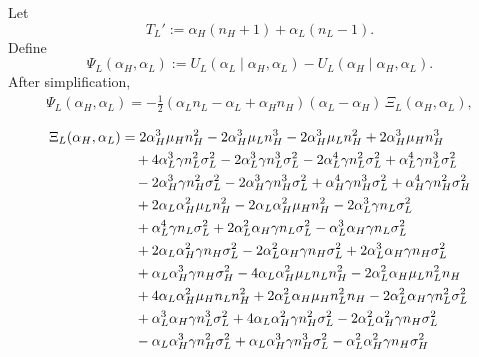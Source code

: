 \documentclass[a4paper,12pt]{article}
\theoremstyle{definition}
\theoremstyle{remark}
\newcommand{\1}{\mathbf{1}}
\begin{document}
Let
\[
    T_L' := \alpha_H(n_H+1) + \alpha_L(n_L-1).
\]
Define
\begin{equation}
    \Psi_L(\alpha_H,\alpha_L)
    := U_L(\alpha_L \mid \alpha_H,\alpha_L)
       - U_L(\alpha_H \mid \alpha_H,\alpha_L).
\end{equation}
After simplification,
\begin{align}
    \Psi_L(\alpha_H,\alpha_L)
    = -\frac{1}{2}
      (\alpha_L n_L - \alpha_L + \alpha_H n_H)
      (\alpha_L - \alpha_H)\,
      \Xi_L(\alpha_H,\alpha_L), \label{eq:PsiL-app}
\end{align}

\begin{align}
    \Xi_L(\alpha_H,\alpha_L)
    &= 2 \alpha_H^3 \mu_H n_H^2 - 2 \alpha_H^3 \mu_L n_H^3 - 2 \alpha_H^3 \mu_L n_H^2 + 2 \alpha_H^3 \mu_H n_H^3 \notag\\
    &\quad + 4 \alpha_L^3 \gamma n_L^2 \sigma_L^2 - 2 \alpha_L^3 \gamma n_L^3 \sigma_L^2 - 2 \alpha_L^4 \gamma n_L^2 \sigma_L^2 + \alpha_L^4 \gamma n_L^3 \sigma_L^2 \notag\\
    &\quad - 2 \alpha_H^3 \gamma n_H^2 \sigma_L^2 - 2 \alpha_H^3 \gamma n_H^3 \sigma_L^2 + \alpha_H^4 \gamma n_H^3 \sigma_L^2 + \alpha_H^4 \gamma n_H^2 \sigma_H^2 \notag\\
    &\quad + 2 \alpha_L \alpha_H^2 \mu_L n_H^2 - 2 \alpha_L \alpha_H^2 \mu_H n_H^2 - 2 \alpha_L^3 \gamma n_L \sigma_L^2 \notag\\
    &\quad + \alpha_L^4 \gamma n_L \sigma_L^2 + 2 \alpha_L^2 \alpha_H \gamma n_L \sigma_L^2 - \alpha_L^3 \alpha_H \gamma n_L \sigma_L^2 \notag\\
    &\quad + 2 \alpha_L \alpha_H^2 \gamma n_H \sigma_L^2 - 2 \alpha_L^2 \alpha_H \gamma n_H \sigma_L^2 + 2 \alpha_L^3 \alpha_H \gamma n_H \sigma_L^2 \notag\\
    &\quad + \alpha_L \alpha_H^3 \gamma n_H \sigma_H^2 - 4 \alpha_L \alpha_H^2 \mu_L n_L n_H^2 - 2 \alpha_L^2 \alpha_H \mu_L n_L^2 n_H \notag\\
    &\quad + 4 \alpha_L \alpha_H^2 \mu_H n_L n_H^2 + 2 \alpha_L^2 \alpha_H \mu_H n_L^2 n_H - 2 \alpha_L^2 \alpha_H \gamma n_L^2 \sigma_L^2 \notag\\
    &\quad + \alpha_L^3 \alpha_H \gamma n_L^3 \sigma_L^2 + 4 \alpha_L \alpha_H^2 \gamma n_H^2 \sigma_L^2 - 2 \alpha_L^2 \alpha_H^2 \gamma n_H \sigma_L^2 \notag\\
    &\quad - \alpha_L \alpha_H^3 \gamma n_H^2 \sigma_L^2 + \alpha_L \alpha_H^3 \gamma n_H^3 \sigma_L^2 - \alpha_L^2 \alpha_H^2 \gamma n_H \sigma_H^2 \notag\\

\end{align}
\end{document}
